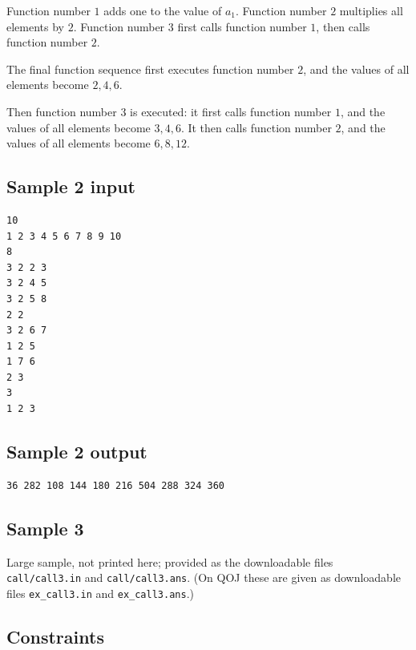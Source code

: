 \documentclass[11pt]{article}
\begin{document}
Function number $1$ adds one to the value of $a_1$.
Function number $2$ multiplies all elements by $2$.
Function number $3$ first calls function number $1$, then calls function
number $2$.

The final function sequence first executes function number $2$, and the values
of all elements become $2, 4, 6$.

Then function number $3$ is executed: it first calls function number $1$, and
the values of all elements become $3, 4, 6$.
It then calls function number $2$, and the values of all elements become
$6, 8, 12$.

\subsection*{Sample 2 input}

\begin{verbatim}
10
1 2 3 4 5 6 7 8 9 10
8
3 2 2 3
3 2 4 5
3 2 5 8
2 2
3 2 6 7
1 2 5
1 7 6
2 3
3
1 2 3
\end{verbatim}

\subsection*{Sample 2 output}

\begin{verbatim}
36 282 108 144 180 216 504 288 324 360
\end{verbatim}

\subsection*{Sample 3}

Large sample, not printed here;
provided as the downloadable files \texttt{call/call3.in} and \texttt{call/call3.ans}.
(On QOJ these are given as downloadable files \texttt{ex\_call3.in} and
\texttt{ex\_call3.ans}.)

\subsection*{Constraints}
\end{document}
